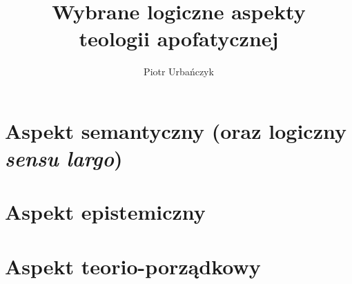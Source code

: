 \documentclass[12pt,a4paper,openany,oneside,leqno,titlepage]{report}
\title{Wybrane logiczne aspekty\\teologii apofatycznej}
\author{Piotr Urbańczyk}
\theoremstyle{definition}
\begin{document}
\stronatytulowa

\tableofcontents
\listoffigures

\cleardoublepage


\part{Aspekt semantyczny (oraz logiczny \textit{sensu largo})}





\part{Aspekt epistemiczny}



\part{Aspekt teorio-porządkowy}




%

%
%
\end{document}
